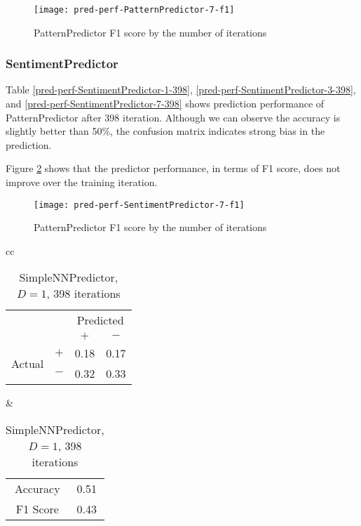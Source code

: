 \documentclass[twocolumn,10pt]{asme2ej}
\begin{document}
\begin{figure}
  \centering
  \texttt{[image: pred-perf-PatternPredictor-7-f1]}
  \caption{PatternPredictor F1 score by the number of iterations}
  \label{pred-perf-PatternPredictor-7-f1}
\end{figure}

\subsubsection{SentimentPredictor}

Table \ref{pred-perf-SentimentPredictor-1-398},
\ref{pred-perf-SentimentPredictor-3-398}, and
\ref{pred-perf-SentimentPredictor-7-398} shows prediction performance
of PatternPredictor after 398 iteration. Although we can observe the
accuracy is slightly better than 50\%, the confusion matrix indicates
strong bias in the prediction.


Figure \ref{pred-perf-SentimentPredictor-7-f1} shows that the predictor
performance, in terms of F1 score, does not improve over the training
iteration. 

\begin{figure}
  \centering
  \texttt{[image: pred-perf-SentimentPredictor-7-f1]}
  \caption{PatternPredictor F1 score by the number of iterations}
  \label{pred-perf-SentimentPredictor-7-f1}
\end{figure}


\begin{table}
  \begin{tabular}{cc}
    \begin{tabular}{cc|cc}
      & & \multicolumn{2}{c}{Predicted} \\
      & & $+ $ & $-$ \\
      \hline
      \multirow{2}{*}{Actual}
      & $+$ & 0.18 & 0.17 \\
      & $-$ & 0.32 & 0.33 \\
      \hline
    \end{tabular}
    &
    \begin{tabular}{cc}
      Accuracy & 0.51 \\
      F1 Score & 0.43 \\
    \end{tabular}
  \end{tabular}
  \caption{SimpleNNPredictor, $D=1$, 398 iterations}
  \label{pred-perf-SimpleNNPredictor-1-398}
\end{table}
\end{document}
